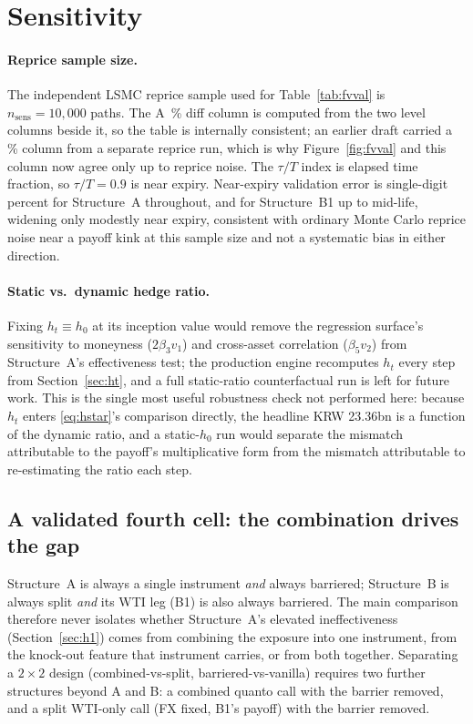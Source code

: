 \documentclass[11pt,a4paper]{article}
\begin{document}
\section{Sensitivity}
\label{sec:sensitivity}

\paragraph{Reprice sample size.} The independent LSMC reprice sample used for Table~\ref{tab:fvval} is $n_{\mathrm{sens}}=10{,}000$ paths. The A~\% diff column is computed from the two level columns beside it, so the table is internally consistent; an earlier draft carried a \% column from a separate reprice run, which is why Figure~\ref{fig:fvval} and this column now agree only up to reprice noise. The $\tau/T$ index is elapsed time fraction, so $\tau/T=0.9$ is near expiry. Near-expiry validation error is single-digit percent for Structure~A throughout, and for Structure~B1 up to mid-life, widening only modestly near expiry, consistent with ordinary Monte Carlo reprice noise near a payoff kink at this sample size and not a systematic bias in either direction.

\paragraph{Static vs.\ dynamic hedge ratio.} Fixing $h_t\equiv h_0$ at its inception value would remove the regression surface's sensitivity to moneyness ($2\beta_3v_1$) and cross-asset correlation ($\beta_5v_2$) from Structure~A's effectiveness test; the production engine recomputes $h_t$ every step from Section~\ref{sec:ht}, and a full static-ratio counterfactual run is left for future work. This is the single most useful robustness check not performed here: because $h_t$ enters \eqref{eq:hstar}'s comparison directly, the headline KRW 23.36bn is a function of the dynamic ratio, and a static-$h_0$ run would separate the mismatch attributable to the payoff's multiplicative form from the mismatch attributable to re-estimating the ratio each step.

\subsection{A validated fourth cell: the combination drives the gap}
\label{sec:vanillabench}

Structure~A is always a single instrument \emph{and} always barriered; Structure~B is always split \emph{and} its WTI leg (B1) is also always barriered. The main comparison therefore never isolates whether Structure~A's elevated ineffectiveness (Section~\ref{sec:h1}) comes from combining the exposure into one instrument, from the knock-out feature that instrument carries, or from both together. Separating a $2\times2$ design (combined-vs-split, barriered-vs-vanilla) requires two further structures beyond A and B: a combined quanto call with the barrier removed, and a split WTI-only call (FX fixed, B1's payoff) with the barrier removed.
\end{document}
